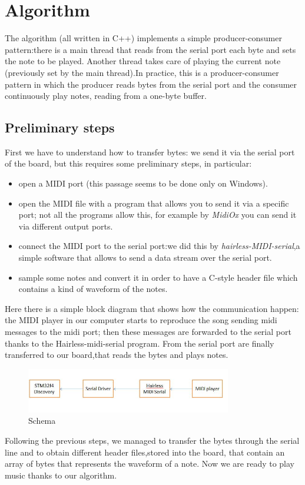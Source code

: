 \documentclass[12pt]{article}
\begin{document}
\section{Algorithm} \label{sec:algorithm}
The algorithm (all written in C++) implements a simple producer-consumer pattern:there is a main thread that reads from the serial port each byte and sets the note to be played. Another thread takes care of playing the current note (previously set by the main thread).In practice, this is a producer-consumer pattern in which the producer reads bytes from the serial port and the consumer continuously play notes, reading from a one-byte buffer.

\subsection{Preliminary steps}
First we have to understand how to transfer bytes: we send it via the serial port of the board, but this requires some preliminary steps, in particular:
\begin{itemize}
	\item open a MIDI port (this passage seems to be done only on Windows).
	\item open the MIDI file with a program that allows you to send it via a specific port; not all the programs allow this, for example by \textit{MidiOx}  you can send it via different output ports.
	\item connect the MIDI port to the serial port:we did this by \textit{hairless-MIDI-serial},a simple software that allows to send a data stream over the serial port.
	\item sample some notes and convert it in order to have a C-style header file which contains a kind of waveform of the notes.
\end{itemize}
Here there is a simple block diagram that shows how the communication happen: the MIDI player in our computer starts to reproduce the song sending midi messages to the midi port; then these messages are forwarded to the serial port thanks to the Hairless-midi-serial program. From the serial port are finally transferred to our board,that reads the bytes and plays notes.
 \begin{figure}[H]
 	\includegraphics[width=0.8\textwidth]{Schema.jpg}
 	\caption{Schema}
 	\label{fig:Schema}
 \end{figure}
Following the previous steps, we managed to transfer the bytes through the serial line and to obtain different header files,stored into the board, that contain an array of bytes that represents the waveform of a note. Now we are ready to play music thanks to our algorithm.
\end{document}
